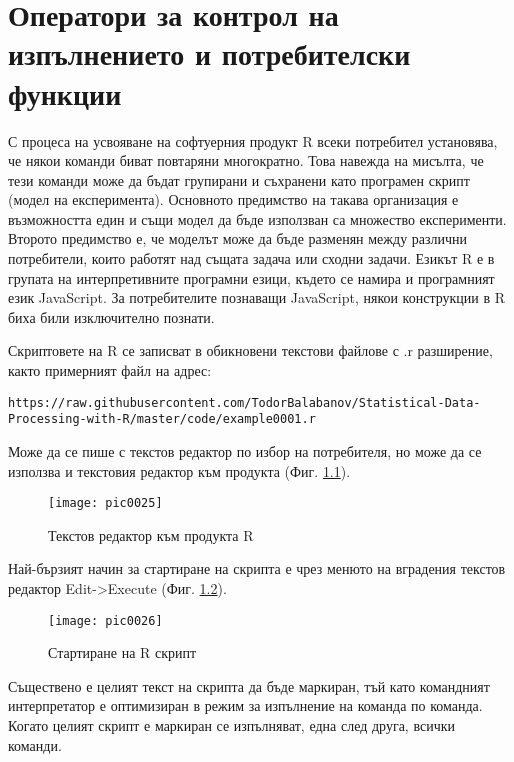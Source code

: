 ﻿\newpage
\chapter{Оператори за контрол на изпълнението и потребителски функции}
\label{chapter05}

С процеса на усвояване на софтуерния продукт R всеки потребител установява, че някои команди биват повтаряни многократно. Това навежда на мисълта, че тези команди може да бъдат групирани и съхранени като програмен скрипт (модел на експеримента). Основното предимство на такава организация е възможността един и същи модел да бъде използван са множество експерименти. Второто предимство е, че моделът може да бъде разменян между различни потребители, които работят над същата задача или сходни задачи. Езикът R е в групата на интерпретивните програмни езици, където се намира и програмният език JavaScript. За потребителите познаващи JavaScript, някои конструкции в R биха били изключително познати. 

Скриптовете на R се записват в обикновени текстови файлове с .r разширение, както примерният файл на адрес:

\begin{lstlisting}[caption=Адрес на примерен R скрипт, label=listing0074]
https://raw.githubusercontent.com/TodorBalabanov/Statistical-Data-Processing-with-R/master/code/example0001.r
\end{lstlisting}

Може да се пише с текстов редактор по избор на потребителя, но може да се използва и текстовия редактор към продукта (Фиг. \ref{figure0025}).

\begin{figure}[h!]
  \centering
  \texttt{[image: pic0025]}
  \caption{Текстов редактор към продукта R}
\label{figure0025}
\end{figure}
\FloatBarrier

Най-бързият начин за стартиране на скрипта е чрез менюто на вградения текстов редактор Edit->Execute (Фиг. \ref{figure0026}). 

\begin{figure}[h!]
  \centering
  \texttt{[image: pic0026]}
  \caption{Стартиране на R скрипт}
\label{figure0026}
\end{figure}
\FloatBarrier

Съществено е целият текст на скрипта да бъде маркиран, тъй като командният интерпретатор е оптимизиран в режим за изпълнение на команда по команда. Когато целият скрипт е маркиран се изпълняват, една след друга, всички команди.


